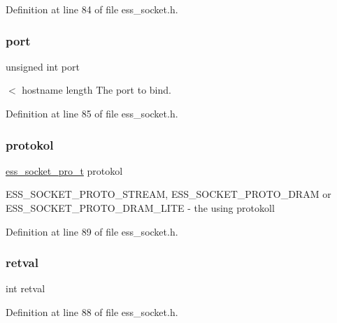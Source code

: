 Definition at line 84 of file ess\+\_\+socket.\+h.

\mbox{\label{structess__socket_a938bdc6ae46c346147b6d4f67ad1e704}} 
\subsubsection{\texorpdfstring{port}{port}}
{\footnotesize\ttfamily unsigned int port}

$<$ hostname length The port to bind. 

Definition at line 85 of file ess\+\_\+socket.\+h.

\mbox{\label{structess__socket_a1f0429596710512357072b192ba3d2bd}} 
\subsubsection{\texorpdfstring{protokol}{protokol}}
{\footnotesize\ttfamily \hyperlink{ess__socket_8h_a1e8e8de805f8e0b7da25e3b177977273}{ess\+\_\+socket\+\_\+pro\+\_\+t} protokol}

{\ttfamily E\+S\+S\+\_\+\+S\+O\+C\+K\+E\+T\+\_\+\+P\+R\+O\+T\+O\+\_\+\+S\+T\+R\+E\+AM}, {\ttfamily E\+S\+S\+\_\+\+S\+O\+C\+K\+E\+T\+\_\+\+P\+R\+O\+T\+O\+\_\+\+D\+R\+AM} or {\ttfamily E\+S\+S\+\_\+\+S\+O\+C\+K\+E\+T\+\_\+\+P\+R\+O\+T\+O\+\_\+\+D\+R\+A\+M\+\_\+\+L\+I\+TE} -\/ the using protokoll 

Definition at line 89 of file ess\+\_\+socket.\+h.

\mbox{\label{structess__socket_a7f345697df7eb20c9aba1ab6980cae8f}} 
\subsubsection{\texorpdfstring{retval}{retval}}
{\footnotesize\ttfamily int retval}



Definition at line 88 of file ess\+\_\+socket.\+h.

\mbox{\label{structess__socket_a3666576f6b88007cc7b8f26c7da596c8}} 
